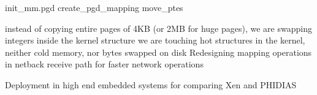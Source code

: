init_mm.pgd
create_pgd_mapping
move_ptes

instead of copying entire pages of 4KB (or 2MB for huge pages), we are swapping integers inside the kernel structure
we are touching hot structures in the kernel, neither cold memory, nor bytes swapped on disk\textbf{}
Redesigning mapping operations in netback receive path for faster network operations


Deployment in high end embedded systems for comparing Xen and PHIDIAS